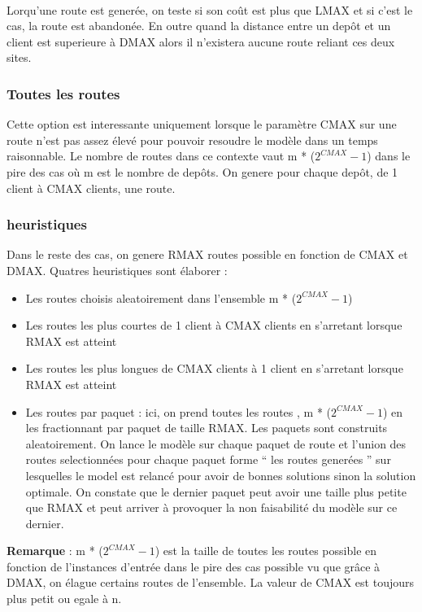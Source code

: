 \documentclass[a4paper,10pt]{article}
\begin{document}
\paragraph{}
Lorqu'une route est generée, on teste si son coût est plus que LMAX et si c'est le cas, la route est abandonée. En outre quand la distance entre
un depôt et un client est superieure à DMAX alors il n'existera aucune route reliant ces deux sites.


\subsubsection*{Toutes les routes}
Cette option est interessante uniquement lorsque le paramètre CMAX sur une route n'est pas assez élevé pour pouvoir resoudre le modèle dans un temps raisonnable.
Le nombre de routes dans ce contexte vaut m * ($2^{CMAX} - 1$) dans le pire des cas où m est le nombre de depôts. On genere pour chaque
depôt, de 1 client à CMAX clients, une route.
    
    
\subsubsection*{heuristiques}
Dans le reste des cas, on genere RMAX routes possible en fonction de CMAX et DMAX. Quatres heuristiques sont élaborer :
\begin{itemize}
 \item Les routes choisis aleatoirement dans l'ensemble m * ($2^{CMAX} - 1$)
 \item Les routes les plus courtes de 1 client à CMAX clients en s'arretant lorsque RMAX est atteint
 \item Les routes les plus longues de CMAX clients à 1 client en s'arretant lorsque RMAX est atteint
 \item Les routes par paquet : ici, on prend toutes les routes , m * ($2^{CMAX} - 1$) en les fractionnant par paquet de taille RMAX. Les paquets sont 
 construits aleatoirement. On lance le modèle  sur chaque paquet de route et l'union des routes selectionnées pour chaque paquet forme `` les routes 
 generées '' sur lesquelles le model est relancé pour avoir de bonnes solutions sinon la solution optimale.
 On constate que le dernier paquet peut avoir une taille plus petite que RMAX et peut arriver à provoquer la non faisabilité du modèle 
 sur ce dernier.
 
\end{itemize}

\textbf{Remarque} : m * ($2^{CMAX} - 1$) est la taille de toutes les routes possible en fonction de l'instances d'entrée dans le pire des cas possible vu que grâce
à DMAX, on élague certains routes de l'ensemble. La valeur de CMAX est toujours plus petit ou egale à n.
\end{document}
